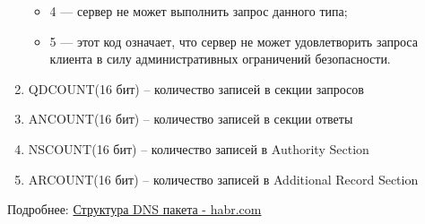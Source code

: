 \documentclass[12pt,onecolumn]{article}
\begin{document}
\begin{enumerate}
{\begin{itemize}
            \item 4 — сервер не может выполнить запрос данного типа;
            \item 5 — этот код означает, что сервер не может удовлетворить запроса клиента в силу административных ограничений безопасности.
        \end{itemize}
    }
    \item QDCOUNT(16 бит) – количество записей в секции запросов
    \item ANCOUNT(16 бит) – количество записей в секции ответы
    \item NSCOUNT(16 бит) – количество записей в Authority Section
    \item ARCOUNT(16 бит) – количество записей в Additional Record Section
\end{enumerate}
Подробнее: \href{https://habr.com/ru/articles/478652/}{Структура DNS пакета - habr.com}
\end{document}
